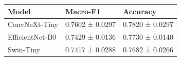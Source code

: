 \begin{tabular}{lll}
\toprule
Model & Macro-F1 & Accuracy \\
\midrule
ConvNeXt-Tiny & 0.7602 ± 0.0297 & 0.7820 ± 0.0297 \\
EfficientNet-B0 & 0.7429 ± 0.0136 & 0.7730 ± 0.0140 \\
Swin-Tiny & 0.7417 ± 0.0288 & 0.7682 ± 0.0266 \\
\bottomrule
\end{tabular}
